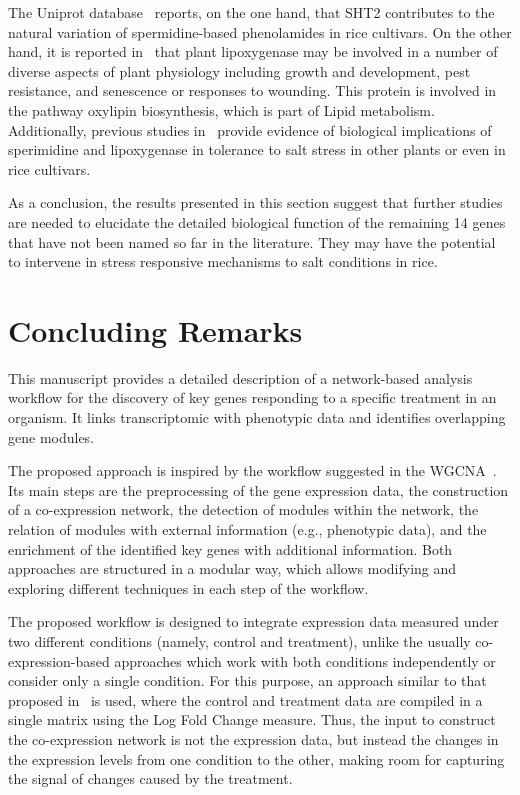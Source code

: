\documentclass{bmcart}
\begin{document}
The Uniprot database~\cite{uniprot2018uniprot} reports, on the one
hand, that SHT2 contributes to the natural variation of
spermidine-based phenolamides in rice cultivars. On the other hand, it
is reported in~\cite{uniprot2018uniprot} that plant lipoxygenase may
be involved in a number of diverse aspects of plant physiology
including growth and development, pest resistance, and senescence or
responses to wounding. This protein is involved in the pathway
oxylipin biosynthesis, which is part of Lipid metabolism. Additionally,
previous studies
%
in~\cite{gupta2013plant,hou2015persimmon,mittova2002salt,peng2019novel,roychoudhury2011amelioration}
%
provide evidence of biological implications of sperimidine and
lipoxygenase in tolerance to salt stress in other plants or even in
rice cultivars.

As a conclusion, the results presented in this section suggest that
further studies are needed to elucidate the detailed biological
function of the remaining 14 genes that have not been named so far in
the literature.  They may have the potential to intervene in stress
responsive mechanisms to salt conditions in rice.


\section*{Concluding Remarks}
\label{sec.concl}

This manuscript provides a detailed description of a network-based
analysis workflow for the discovery of key genes responding to a
specific treatment in an organism. It links transcriptomic with
phenotypic data and identifies overlapping gene modules.
\vspace{0.5cm}

The proposed approach is inspired by the workflow suggested in the
WGCNA~\cite{langfelder2008wgcna}. Its main steps are the preprocessing
of the gene expression data, the construction of a co-expression
network, the detection of modules within the network, the relation of
modules with external information (e.g., phenotypic data), and the
enrichment of the identified key genes with additional information.
Both approaches are structured in a modular way, which allows
modifying and exploring different techniques in each step of the
workflow.
\vspace{0.5cm}

The proposed workflow is designed to integrate expression data
measured under two different conditions (namely, control and
treatment), unlike the usually co-expression-based approaches which
work with both conditions independently or consider only a single
condition. For this purpose, an approach similar to that proposed
in~\cite{du2019network} is used, where the control and treatment data
are compiled in a single matrix using the Log Fold Change
measure. Thus, the input to construct the co-expression network is not
the expression data, but instead the changes in the expression levels
from one condition to the other, making room for capturing the signal
of changes caused by the treatment.
\vspace{0.5cm}
\end{document}
